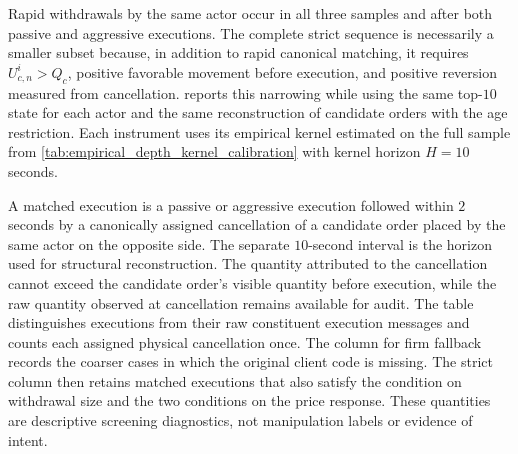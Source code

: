 \documentclass[11pt]{article}
\newenvironment{review}{\begingroup\color{blue}}{\endgroup}
\begin{document}
\begin{review}Rapid withdrawals by the same actor\end{review} occur in all three samples and after both passive and aggressive executions. The complete
strict sequence is necessarily a smaller subset because, in addition to rapid canonical matching, it requires
$U^{i}_{c,n}>Q_c$, \begin{review}positive favorable movement before execution\end{review}, and \begin{review}positive reversion measured from cancellation\end{review}.
\begin{review} reports this narrowing while using the same top-$10$ state for each actor and the same reconstruction of candidate orders with the age restriction.\end{review} Each instrument uses \begin{review}its empirical kernel estimated on the full sample\end{review} from
\cref{tab:empirical_depth_kernel_calibration} with kernel horizon $H=10$ seconds.

A matched execution is a passive or aggressive execution followed within $2$ seconds by a canonically assigned cancellation
of \begin{review}a candidate order placed by the same actor on the opposite side\end{review}. The separate $10$-second interval is \begin{review}the horizon used for structural reconstruction\end{review}.
\begin{review}The quantity attributed to the cancellation\end{review} cannot exceed the candidate order's visible quantity before execution, while \begin{review}the raw quantity observed at cancellation\end{review} remains available for audit. The table distinguishes executions from \begin{review}their raw constituent execution messages\end{review} and counts each assigned physical cancellation once. \begin{review}The column for firm fallback\end{review} records the coarser cases in which the
original client code is missing. The strict column then retains matched executions that also satisfy \begin{review}the condition on withdrawal size and the two conditions on the price response\end{review}. These quantities are descriptive screening diagnostics, not manipulation labels or evidence of
intent.
\end{document}
